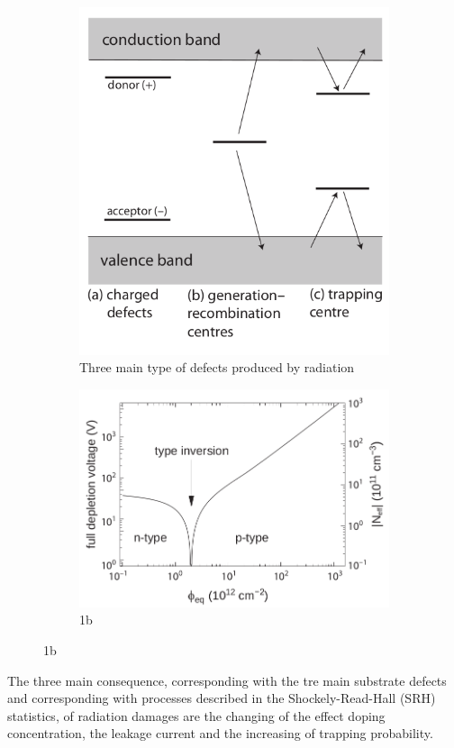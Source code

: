 \begin{figure}
   \begin{subfigure}{.5\textwidth}
     \centering
     \includegraphics[width=.8\linewidth]{figures/radiation_damage_scheme.png}
     \caption{Three main type of defects produced by radiation}
     \label{fig:radiation_damage_scheme}
   \end{subfigure}%
   \begin{subfigure}{.5\textwidth}
     \centering
     \includegraphics[width=.8\linewidth]{figures/type_inversion.png}
     \caption{1b}
     \label{fig:type_inversion}
   \end{subfigure}
\end{figure}
The three main consequence, corresponding with the tre main substrate defects and corresponding with processes described in the Shockely-Read-Hall (SRH) statistics, of radiation damages are the changing of the effect doping concentration, the leakage current and the increasing of trapping probability.

